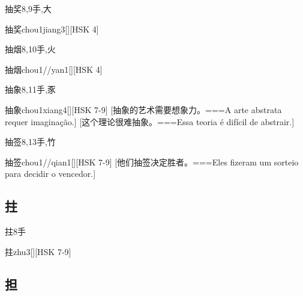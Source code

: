 \begin{Entry}{抽奖}{8,9}{⼿,⼤}
  \begin{Phonetics}{抽奖}{chou1jiang3}[][HSK 4]
  \end{Phonetics}
\end{Entry}

\begin{Entry}{抽烟}{8,10}{⼿,⽕}
  \begin{Phonetics}{抽烟}{chou1//yan1}[][HSK 4]
  \end{Phonetics}
\end{Entry}

\begin{Entry}{抽象}{8,11}{⼿,⾗}
  \begin{Phonetics}{抽象}{chou1xiang4}[][HSK 7-9]
    [抽象的艺术需要想象力。===A arte abstrata requer imaginação.]
    [这个理论很难抽象。===Essa teoria é difícil de abstrair.]
  \end{Phonetics}
\end{Entry}

\begin{Entry}{抽签}{8,13}{⼿,⽵}
  \begin{Phonetics}{抽签}{chou1//qian1}[][HSK 7-9]
    [他们抽签决定胜者。===Eles fizeram um sorteio para decidir o vencedor.]
  \end{Phonetics}
\end{Entry}

\subsection*{拄}

\begin{Entry}{拄}{8}{⼿}
  \begin{Phonetics}{拄}{zhu3}[][HSK 7-9]
  \end{Phonetics}
\end{Entry}

\subsection*{担}

